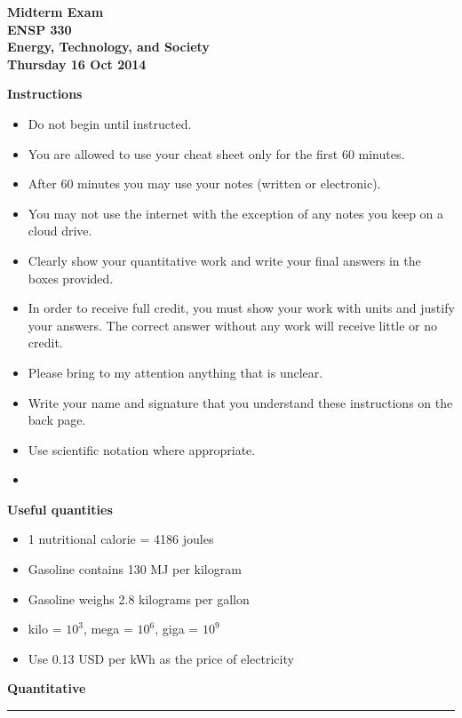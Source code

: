 \documentclass[12pt, oneside]{article}
\newcommand{\chead}[1]
{\begin{center}\large\textbf{#1}\end{center}
\hrule
\vspace{10pt}}
\begin{document}
\begin{center}
{\bf Midterm Exam}\\
{\bf ENSP 330}\\
{\bf Energy, Technology, and Society}\\
{\bf Thursday 16 Oct 2014}\\
\end{center}


\noindent
{\bf Instructions}
\begin{itemize}
\item Do not begin until instructed.
\item You are allowed to use your cheat sheet only for the first 60
minutes.
\item After 60 minutes you may use your notes (written or electronic).
\item You may not use the internet with the exception of any notes you
keep on a cloud drive.
\item Clearly show your quantitative work and write your final answers
in the boxes provided.
\item In order to receive full credit, you must show your work with
units and justify your answers.  The correct answer without any work
will receive little or no credit.
\item Please bring to my attention anything that is unclear.
\item Write your name and signature that you understand these
instructions on the back page.
\item Use scientific notation where appropriate.
\item
\end{itemize}

\noindent
{\bf Useful quantities}
\begin{itemize}
\item 1 nutritional calorie = 4186 joules
\item Gasoline contains 130 MJ per kilogram
\item Gasoline weighs 2.8 kilograms per gallon
\item kilo = $10^3$, mega = $10^6$, giga = $10^9$
\item Use 0.13 USD per kWh as the price of electricity
\end{itemize}

\vfill


%
%

\newpage
\chead{Quantitative}
\end{document}

